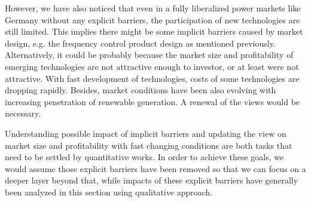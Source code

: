 However, we have also noticed that even in a fully liberalized power markets like Germany without any explicit barriers, the participation of new technologies are still limited. This implies there might be some implicit barriers caused by market design, e.g. the frequency control product design as mentioned previously. Alternatively, it could be probably because the market size and profitability of emerging technologies are not attractive enough to investor, or at least were not attractive. With fast development of technologies, costs of some technologies are dropping rapidly. Besides, market conditions have been also evolving with increasing penetration of renewable generation. A renewal of the views would be necessary. 

Understanding possible impact of implicit barriers and updating the view on market size and profitability with fast changing conditions are both tasks that need to be settled by quantitative works. In order to achieve these goals, we would assume those explicit barriers have been removed so that we can focus on a deeper layer beyond that, while impacts of these explicit barriers have generally been analyzed in this section using qualitative approach.





